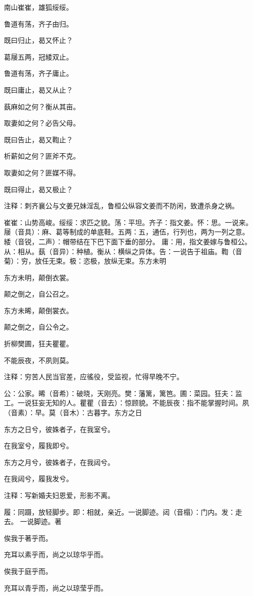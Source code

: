 \documentclass[12pt,UTF8]{ctexbook}
\begin{document}
南山崔崔，雄狐绥绥。

鲁道有荡，齐子由归。

既曰归止，曷又怀止？

葛屦五两，冠緌双止。

鲁道有荡，齐子庸止。

既曰庸止，曷又从止？

蓺麻如之何？衡从其亩。

取妻如之何？必告父母。

既曰告止，曷又鞫止？

析薪如之何？匪斧不克。

取妻如之何？匪媒不得。

既曰得止，曷又极止？

注释：刺齐襄公与文姜兄妹淫乱，鲁桓公纵容文姜而不防闲，致遭杀身之祸。

崔崔：山势高峻。绥绥：求匹之貌。荡：平坦。齐子：指文姜。怀：思。一说来。屦（音具）：麻、葛等制成的单底鞋。五两：五，通伍，行列也，两为一列之意。緌（音锐，二声）：帽带结在下巴下面下垂的部分。 庸：用，指文姜嫁与鲁桓公。从：相从。蓺（音异）：种植。衡从：横纵之异体。告：一说告于祖庙。鞫（音菊）：穷，放任无束。极：恣极，放纵无束。东方未明

东方未明，颠倒衣裳。

颠之倒之，自公召之。

东方未晞，颠倒裳衣。

颠之倒之，自公令之。

折柳樊圃，狂夫瞿瞿。

不能辰夜，不夙则莫。

注释：穷苦人民当官差，应徭役，受监视，忙得早晚不宁。

公：公家。晞（音希）：破晓，天刚亮。樊：藩篱，篱笆。圃：菜园。狂夫：监工。一说狂妄无知的人。瞿瞿（音去）：惊顾貌。不能辰夜：指不能掌握时间。夙（音素）：早。莫（音木）：古暮字。东方之日

东方之日兮，彼姝者子，在我室兮。

在我室兮，履我即兮。

东方之月兮，彼姝者子，在我闼兮。

在我闼兮，履我发兮。

注释：写新婚夫妇恩爱，形影不离。

履：同蹑，放轻脚步。即：相就，亲近。一说脚迹。闼（音榻）：门内。发：走去。 一说脚迹。著

俟我于著乎而。

充耳以素乎而，尚之以琼华乎而。

俟我于庭乎而。

充耳以青乎而，尚之以琼莹乎而。
\end{document}
